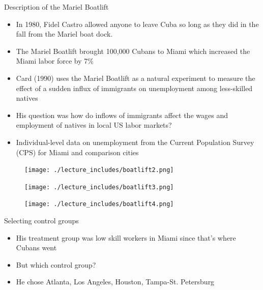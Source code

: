 \documentclass{beamer}
\begin{document}
\begin{frame}{Description of the Mariel Boatlift}
	
	\begin{itemize}
	\item In 1980, Fidel Castro allowed anyone to leave Cuba so long as they did in the fall from the Mariel boat dock.
	\item The Mariel Boatlift brought 100,000 Cubans to Miami which increased the Miami labor force by 7\%
	\item Card (1990) uses the Mariel Boatlift as a natural experiment to measure the effect of a sudden influx of immigrants on unemployment among less-skilled natives
	\item His question was how do inflows of immigrants affect the wages and employment of natives in local US labor markets?
	\item Individual-level data on unemployment from the Current Population Survey (CPS) for Miami and comparison cities
	\end{itemize}
\end{frame}


\begin{frame}[plain]
	\begin{figure}
	\texttt{[image: ./lecture\_includes/boatlift2.png]}
	\end{figure}
\end{frame}

\begin{frame}[plain]
	\begin{figure}
	\texttt{[image: ./lecture\_includes/boatlift3.png]}
	\end{figure}
\end{frame}

\begin{frame}[plain]
	\begin{figure}
	\texttt{[image: ./lecture\_includes/boatlift4.png]}
	\end{figure}
\end{frame}



\begin{frame}{Selecting control groups}

\begin{itemize}

\item His treatment group was low skill workers in Miami since that's where Cubans went
\item But which control group?
\item He chose Atlanta, Los Angeles, Houston, Tampa-St. Petersburg

\end{itemize}

\end{frame}
\end{document}
